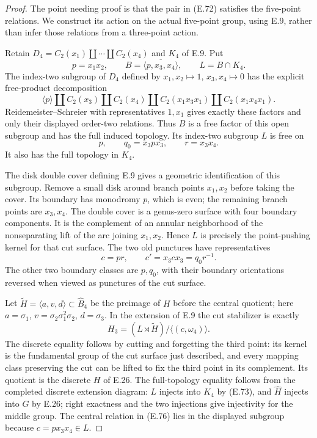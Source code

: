 \begin{proof}
The point needing proof is that the pair in
(E.72) satisfies the five-point relations.  We
construct its action on the actual five-point
group, using E.9, rather than infer those
relations from a three-point action.

Retain $D_4=C_2(x_1)\amalg\cdots\amalg C_2(x_4)$
and $K_4$ of E.9.  Put
\[
 p=x_1x_2,\qquad
 B=\overline{\langle p,x_3,x_4\rangle},\qquad
 L=B\cap K_4.
\]
The index-two subgroup of $D_4$ defined by
$x_1,x_2\mapsto1$, $x_3,x_4\mapsto0$ has the
explicit free-product decomposition
\[
 \langle p\rangle\amalg C_2(x_3)\amalg C_2(x_4)
 \amalg C_2(x_1x_3x_1)\amalg C_2(x_1x_4x_1).
                                                               \tag{E.73}
\]
Reidemeister--Schreier with representatives
$1,x_1$ gives exactly these factors and only
their displayed order-two relations.
Thus $B$ is a free factor of this open subgroup
and has the full induced topology.  Its
index-two subgroup $L$ is free on
\[
             p,\qquad q_0=x_3px_3,
                  \qquad r=x_3x_4.                     \tag{E.74}
\]
It also has the full topology in $K_4$.

The disk double cover defining E.9 gives a
geometric identification of this subgroup.
Remove a small disk around branch points
$x_1,x_2$ before taking the cover.  Its
boundary has monodromy $p$, which is even;
the remaining branch points are $x_3,x_4$.
The double cover is a genus-zero surface
with four boundary components.  It is the
complement of an annular neighborhood of the
nonseparating lift of the arc joining
$x_1,x_2$.  Hence $L$ is precisely the
point-pushing kernel for that cut surface.
The two old punctures have representatives
\[
                 c=pr,
       \qquad c'=x_3cx_3=q_0r^{-1}.                     \tag{E.75}
\]
The other two boundary classes are $p,q_0$,
with their boundary orientations reversed
when viewed as punctures of the cut surface.

Let $\widetilde H=\langle a,v,d\rangle
\subset\widehat B_4$ be the preimage of $H$
before the central quotient; here
$a=\sigma_1$, $v=\sigma_2\sigma_1^2\sigma_2$,
$d=\sigma_3$.  In the extension of E.9 the
cut stabilizer is exactly
\[
 H_3=(L\rtimes\widetilde H)/
               \langle(c,\omega _4)\rangle.        \tag{E.76}
\]
The discrete equality follows by cutting and
forgetting the third point: its kernel is
the fundamental group of the cut surface
just described, and every mapping class
preserving the cut can be lifted to fix the
third point in its complement.  Its quotient
is the discrete $H$ of E.26.
The full-topology equality follows from the
completed discrete extension diagram: $L$
injects into $K_4$ by (E.73), and
$\widehat H$ injects into $G$ by E.26;
right exactness and the two injections give
injectivity for the middle group.
The central relation in (E.76) lies in the
displayed subgroup because $c=px_3x_4\in L$.


\end{proof}
